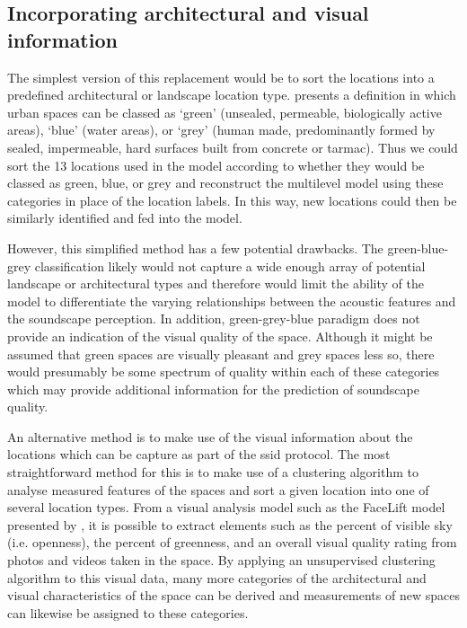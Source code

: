 \subsection{Incorporating architectural and visual information}

The simplest version of this replacement would be to sort the locations into a predefined architectural or landscape location type. \citet{Suligowski2021Quantity} presents a definition in which urban spaces can be classed as `green' (unsealed, permeable, biologically active areas), `blue' (water areas), or `grey' (human made, predominantly formed by sealed, impermeable, hard surfaces built from concrete or tarmac). Thus we could sort the 13 locations used in the model according to whether they would be classed as green, blue, or grey and reconstruct the multilevel model using these categories in place of the location labels. In this way, new locations could then be similarly identified and fed into the model.

However, this simplified method has a few potential drawbacks. The green-blue-grey classification likely would not capture a wide enough array of potential landscape or architectural types and therefore would limit the ability of the model to differentiate the varying relationships between the acoustic features and the soundscape perception. In addition, green-grey-blue paradigm does not provide an indication of the visual quality of the space. Although it might be assumed that green spaces are visually pleasant and grey spaces less so, there would presumably be some spectrum of quality within each of these categories which may provide additional information for the prediction of soundscape quality.

An alternative method is to make use of the visual information about the locations which can be capture as part of the \gls{ssid} protocol. The most straightforward method for this is to make use of a clustering algorithm to analyse measured features of the spaces and sort a given location into one of several location types. From a visual analysis model such as the FaceLift model presented by \citet{Joglekar2020Facelift}, it is possible to extract elements such as the percent of visible sky (i.e. openness), the percent of greenness, and an overall visual quality rating from photos and videos taken in the space. By applying an unsupervised clustering algorithm to this visual data, many more categories of the architectural and visual characteristics of the space can be derived and measurements of new spaces can likewise be assigned to these categories.

